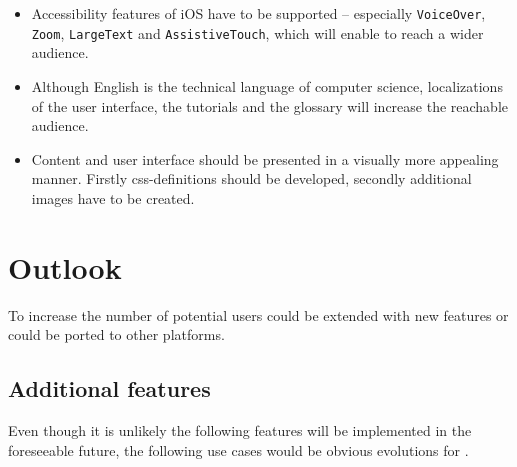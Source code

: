 \begin{itemize}

\item Accessibility features of iOS have to be supported – especially 
\verb+VoiceOver+, \verb+Zoom+, \verb+LargeText+ and \verb+AssistiveTouch+,
which will enable \Nyaya to reach a wider audience.

\item Although English is the technical language of computer science,
localizations of the user interface, the tutorials and the glossary will increase 
the reachable audience.
%
%


\item Content and user interface should be presented in a visually more appealing manner.
Firstly css-definitions should be developed, secondly additional images have to be created.

\end{itemize}
%
%
%
%
%

\section{Outlook}

To increase the number of potential users
\Nyaya could be extended with new features
or \Nyaya could be ported to other platforms.

\subsection{Additional features}

Even though it is unlikely the following features will be implemented in the foreseeable future, 
the following use cases would be obvious evolutions for \Nyaya.

